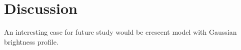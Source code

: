 \section{Discussion}

An interesting case for future study would be crescent model with Gaussian brightness profile.